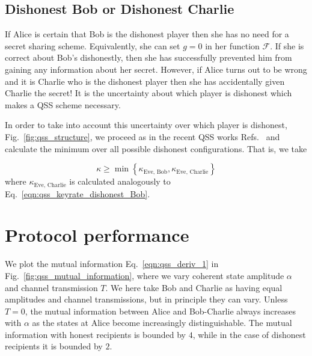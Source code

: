 \subsection{Dishonest Bob or Dishonest Charlie}
If Alice is certain that Bob is the dishonest player then she has no need for a secret sharing scheme. Equivalently, she can set $g=0$ in her function $\mathcal{F}$. If she is correct about Bob's dishonestly, then she has successfully prevented him from gaining any information about her secret. However, if Alice turns out to be wrong and it is Charlie who is the dishonest player then she has accidentally given Charlie the secret! It is the uncertainty about which player is dishonest which makes a QSS scheme necessary.

In order to take into account this uncertainty over which player is dishonest, Fig.~\ref{fig:qss_structure}, we proceed as in the recent QSS works Refs.~\cite{Kogias2017, Grice2019} and calculate the minimum over all possible dishonest configurations. That is, we take

\begin{equation}\label{eqn:qss_key_rate_min}
\kappa \ge \min \left\{\kappa_{\text{Eve, Bob}}, \kappa_{\text{Eve, Charlie}}\right\}
\end{equation}
where $\kappa_{\text{Eve, Charlie}}$ is calculated analogously to Eq.~\ref{eqn:qss_keyrate_dishonest_Bob}. 


\section{Protocol performance}



We plot the mutual information Eq.~\ref{eqn:qss_deriv_1} in Fig.~\ref{fig:qss_mutual_information}, where we vary coherent state amplitude $\alpha$ and channel transmission $T$. We here take Bob and Charlie as having equal amplitudes and channel transmissions, but in principle they can vary. Unless $T=0$, the mutual information between Alice and Bob-Charlie always increases with $\alpha$ as the states at Alice become increasingly distinguishable. The mutual information with honest recipients is bounded by $4$, while in the case of dishonest recipients it is bounded by $2$.

